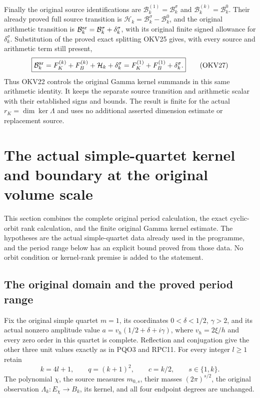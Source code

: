 \documentclass[11pt,a4paper]{article}
\begin{document}
Finally the original source identifications are
$\mathcal B_k^{(1)}=\mathcal B_k^\sigma$ and
$\mathcal B_k^{(k)}=\mathcal B_k^0$. Their already proved full
source transition is $\mathcal H_k=\mathcal B_k^\sigma-\mathcal B_k^0$,
and the original arithmetic transition is
$\mathcal B_k^{\rm ar}=\mathcal B_k^\sigma+\delta_k^\sigma$,
with its original finite signed allowance for $\delta_k^\sigma$.
Substitution of the proved exact splitting OKV25 gives, with every
source and arithmetic term still present,
\[
 \boxed{\mathcal B_k^{\rm ar}
   =F_K^{(k)}+F_B^{(k)}+\mathcal H_k+\delta_k^\sigma
   =F_K^{(1)}+F_B^{(1)}+\delta_k^\sigma.}
 \tag{OKV27}
\]
Thus OKV22 controls the original Gamma kernel summands in this
same arithmetic identity. It keeps the separate source transition
and arithmetic scalar with their established signs and bounds.
The result is finite for the actual $r_K=\dim\ker\Lambda$ and
uses no additional asserted dimension estimate or replacement source.


\clearpage
\section{The actual simple-quartet kernel and boundary at the original volume scale}
\label{sec:OMV}

This section combines the complete original period calculation,
the exact cyclic-orbit rank calculation, and the finite original
Gamma kernel estimate. The hypotheses are the actual simple-quartet
data already used in the programme, and the period range below has
an explicit bound proved from those data. No orbit condition or
kernel-rank premise is added to the statement.

\subsection{The original domain and the proved period range}
Fix the original simple quartet $m=1$, its coordinates
$0<\delta<1/2$, $\gamma>2$, and its actual nonzero amplitude value
$a=v_h(1/2+\delta+i\gamma)$, where $v_h=2\xi/h$ and every
zero order in this quartet is complete. Reflection and conjugation
give the other three unit values exactly as in PQO3 and RPC11.
For every integer $l\geq1$ retain
\[
 k=4l+1,\qquad q=(k+1)^2,\qquad c=k/2,
 \qquad s\in\{1,k\}.
 \tag{OMV1}
\]
The polynomial $\chi$, the source measures $m_{0,s}$, their masses
$(2\pi)^{s/2}$, the original observation $\Lambda_k:E_\chi\to B_k$,
its kernel, and all four endpoint degrees are unchanged.
\end{document}
